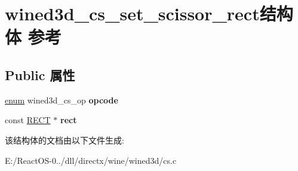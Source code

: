 \hypertarget{structwined3d__cs__set__scissor__rect}{}\section{wined3d\+\_\+cs\+\_\+set\+\_\+scissor\+\_\+rect结构体 参考}
\label{structwined3d__cs__set__scissor__rect}
\subsection*{Public 属性}
\begin{DoxyCompactItemize}
\item 
\mbox{\label{structwined3d__cs__set__scissor__rect_a2d45d481a53f3e04bb57069c50cf1987}} 
\hyperlink{interfaceenum}{enum} wined3d\+\_\+cs\+\_\+op {\bfseries opcode}
\item 
\mbox{\label{structwined3d__cs__set__scissor__rect_af395b0114aec8dcc63909a6b75620267}} 
const \hyperlink{structtag_r_e_c_t}{R\+E\+CT} $\ast$ {\bfseries rect}
\end{DoxyCompactItemize}


该结构体的文档由以下文件生成\+:\begin{DoxyCompactItemize}
\item 
E\+:/\+React\+O\+S-\/0../dll/directx/wine/wined3d/cs.\+c\end{DoxyCompactItemize}
